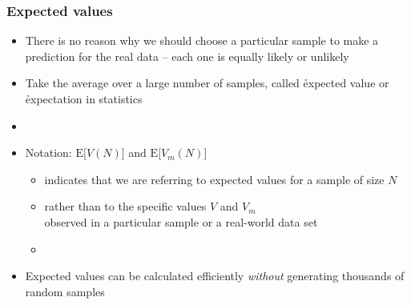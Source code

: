 \documentclass[t]{beamer} %
\begin{document}
\begin{frame}
  \frametitle{Expected values}

  \begin{itemize}
  \item There is no reason why we should choose a particular sample to make a
    prediction for the real data -- each one is equally likely or unlikely
  \item Take the average over a large number of samples, called \h{expected
      value} or \h{expectation} in statistics
  \item[]
  \item Notation: $\text{E}\bigl[V(N)\bigr]$ and $\text{E}\bigl[V_m(N)\bigr]$
    \begin{itemize}
    \item indicates that we are referring to expected values for a sample of
      size $N$
    \item rather than to the specific values $V$ and $V_m$\\
      observed in a particular sample or a real-world data set
    \item[]
    \end{itemize}
  \item Expected values can be calculated efficiently \emph{without}
    generating thousands of random samples
  \end{itemize}
\end{frame}
\end{document}
